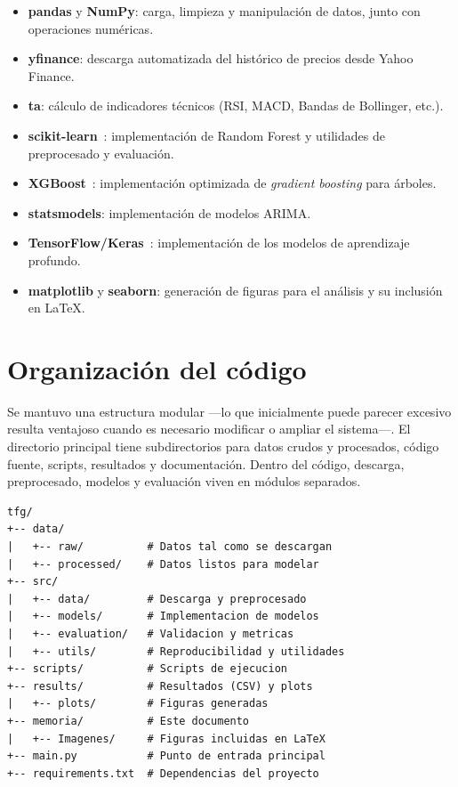 \begin{itemize}
    \item \textbf{pandas} y \textbf{NumPy}: carga, limpieza y manipulación de datos, junto con operaciones numéricas.
    
    \item \textbf{yfinance}: descarga automatizada del histórico de precios desde Yahoo Finance.
    
    \item \textbf{ta}: cálculo de indicadores técnicos (RSI, MACD, Bandas de Bollinger, etc.).
    
    \item \textbf{scikit-learn}~\cite{pedregosa2011scikit}: implementación de Random Forest y utilidades de preprocesado y evaluación.
    
    \item \textbf{XGBoost}~\cite{chen2016xgboost}: implementación optimizada de \textit{gradient boosting} para árboles.
    
    \item \textbf{statsmodels}: implementación de modelos ARIMA.
    
    \item \textbf{TensorFlow/Keras}~\cite{abadi2016tensorflow}: implementación de los modelos de aprendizaje profundo.
    
    \item \textbf{matplotlib} y \textbf{seaborn}: generación de figuras para el análisis y su inclusión en LaTeX.
\end{itemize}

\section{Organización del código}

Se mantuvo una estructura modular ---lo que inicialmente puede parecer excesivo resulta ventajoso cuando es necesario modificar o ampliar el sistema---. El directorio principal tiene subdirectorios para datos crudos y procesados, código fuente, scripts, resultados y documentación. Dentro del código, descarga, preprocesado, modelos y evaluación viven en módulos separados.

\begin{verbatim}
tfg/
+-- data/
|   +-- raw/          # Datos tal como se descargan
|   +-- processed/    # Datos listos para modelar
+-- src/
|   +-- data/         # Descarga y preprocesado
|   +-- models/       # Implementacion de modelos
|   +-- evaluation/   # Validacion y metricas
|   +-- utils/        # Reproducibilidad y utilidades
+-- scripts/          # Scripts de ejecucion
+-- results/          # Resultados (CSV) y plots
|   +-- plots/        # Figuras generadas
+-- memoria/          # Este documento
|   +-- Imagenes/     # Figuras incluidas en LaTeX
+-- main.py           # Punto de entrada principal
+-- requirements.txt  # Dependencias del proyecto
\end{verbatim}


